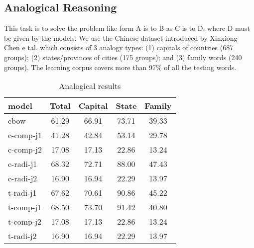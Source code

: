 \subsection{Analogical Reasoning}
This task is to solve the problem like form A is to B as C is to D, where D must be given by the models. We use the Chinese dataset introduced by Xinxiong Chen e tal. which consists of 3 analogy types: (1) capitals of countries (687 groups); (2) states/provinces of cities (175 groups); and (3) family words (240 groups). The learning corpus covers more than 97\% of all the testing words. 
\begin{table}[h]
\begin{center}
\begin{tabular}{lcccc}
\hline \bf model & \bf Total & \bf Capital & \bf State & \bf Family\\ \hline
cbow & 61.29 & 66.91 & 73.71 & 39.33 \\
c-comp-j1\footnotemark[1] & 41.28 & 42.84 & 53.14 & 29.78 \\   
c-comp-j2 & 17.08 & 17.13 & 22.86 & 13.24 \\
c-radi-j1 & 68.32 & 72.71 & 88.00 & 47.43 \\
c-radi-j2 & 16.90 & 16.94 & 22.29 & 13.97 \\
t-radi-j1  & 67.62 & 70.61 & 90.86 & 45.22 \\
t-comp-j1  & 68.50 & 73.70 & 91.42 & 40.80 \\
t-comp-j2 & 17.08 & 17.13 & 22.86 & 13.24 \\
t-radi-j2 & 16.90 & 16.94 & 22.29 & 13.97 \\
\hline
\end{tabular}
\end{center}
\caption{\label{font-table} Analogical results }
\end{table}
